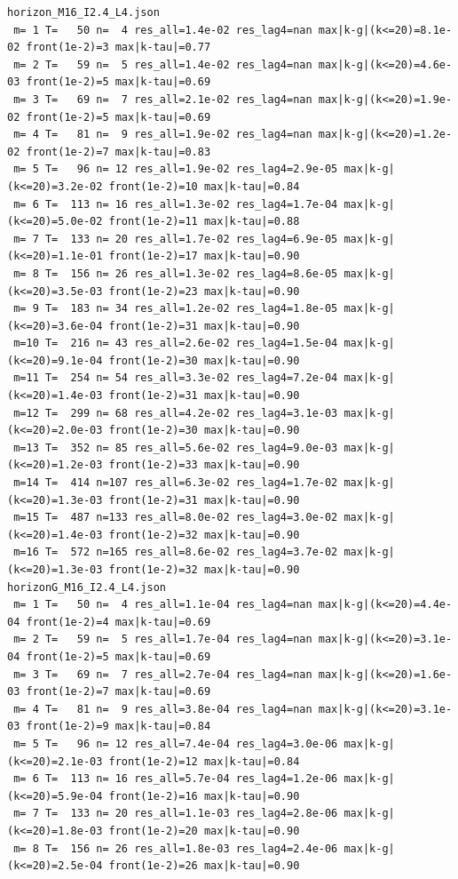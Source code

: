 \documentclass[11pt,reqno]{amsart}
\numberwithin{equation}{section}
\theoremstyle{plain}
\theoremstyle{definition}
\theoremstyle{remark}
\begin{document}
\begin{lstlisting}[style=out]
horizon_M16_I2.4_L4.json
 m= 1 T=   50 n=  4 res_all=1.4e-02 res_lag4=nan max|k-g|(k<=20)=8.1e-02 front(1e-2)=3 max|k-tau|=0.77
 m= 2 T=   59 n=  5 res_all=1.4e-02 res_lag4=nan max|k-g|(k<=20)=4.6e-03 front(1e-2)=5 max|k-tau|=0.69
 m= 3 T=   69 n=  7 res_all=2.1e-02 res_lag4=nan max|k-g|(k<=20)=1.9e-02 front(1e-2)=5 max|k-tau|=0.69
 m= 4 T=   81 n=  9 res_all=1.9e-02 res_lag4=nan max|k-g|(k<=20)=1.2e-02 front(1e-2)=7 max|k-tau|=0.83
 m= 5 T=   96 n= 12 res_all=1.9e-02 res_lag4=2.9e-05 max|k-g|(k<=20)=3.2e-02 front(1e-2)=10 max|k-tau|=0.84
 m= 6 T=  113 n= 16 res_all=1.3e-02 res_lag4=1.7e-04 max|k-g|(k<=20)=5.0e-02 front(1e-2)=11 max|k-tau|=0.88
 m= 7 T=  133 n= 20 res_all=1.7e-02 res_lag4=6.9e-05 max|k-g|(k<=20)=1.1e-01 front(1e-2)=17 max|k-tau|=0.90
 m= 8 T=  156 n= 26 res_all=1.3e-02 res_lag4=8.6e-05 max|k-g|(k<=20)=3.5e-03 front(1e-2)=23 max|k-tau|=0.90
 m= 9 T=  183 n= 34 res_all=1.2e-02 res_lag4=1.8e-05 max|k-g|(k<=20)=3.6e-04 front(1e-2)=31 max|k-tau|=0.90
 m=10 T=  216 n= 43 res_all=2.6e-02 res_lag4=1.5e-04 max|k-g|(k<=20)=9.1e-04 front(1e-2)=30 max|k-tau|=0.90
 m=11 T=  254 n= 54 res_all=3.3e-02 res_lag4=7.2e-04 max|k-g|(k<=20)=1.4e-03 front(1e-2)=31 max|k-tau|=0.90
 m=12 T=  299 n= 68 res_all=4.2e-02 res_lag4=3.1e-03 max|k-g|(k<=20)=2.0e-03 front(1e-2)=30 max|k-tau|=0.90
 m=13 T=  352 n= 85 res_all=5.6e-02 res_lag4=9.0e-03 max|k-g|(k<=20)=1.2e-03 front(1e-2)=33 max|k-tau|=0.90
 m=14 T=  414 n=107 res_all=6.3e-02 res_lag4=1.7e-02 max|k-g|(k<=20)=1.3e-03 front(1e-2)=31 max|k-tau|=0.90
 m=15 T=  487 n=133 res_all=8.0e-02 res_lag4=3.0e-02 max|k-g|(k<=20)=1.4e-03 front(1e-2)=32 max|k-tau|=0.90
 m=16 T=  572 n=165 res_all=8.6e-02 res_lag4=3.7e-02 max|k-g|(k<=20)=1.3e-03 front(1e-2)=32 max|k-tau|=0.90
horizonG_M16_I2.4_L4.json
 m= 1 T=   50 n=  4 res_all=1.1e-04 res_lag4=nan max|k-g|(k<=20)=4.4e-04 front(1e-2)=4 max|k-tau|=0.69
 m= 2 T=   59 n=  5 res_all=1.7e-04 res_lag4=nan max|k-g|(k<=20)=3.1e-04 front(1e-2)=5 max|k-tau|=0.69
 m= 3 T=   69 n=  7 res_all=2.7e-04 res_lag4=nan max|k-g|(k<=20)=1.6e-03 front(1e-2)=7 max|k-tau|=0.69
 m= 4 T=   81 n=  9 res_all=3.8e-04 res_lag4=nan max|k-g|(k<=20)=3.1e-03 front(1e-2)=9 max|k-tau|=0.84
 m= 5 T=   96 n= 12 res_all=7.4e-04 res_lag4=3.0e-06 max|k-g|(k<=20)=2.1e-03 front(1e-2)=12 max|k-tau|=0.84
 m= 6 T=  113 n= 16 res_all=5.7e-04 res_lag4=1.2e-06 max|k-g|(k<=20)=5.9e-04 front(1e-2)=16 max|k-tau|=0.90
 m= 7 T=  133 n= 20 res_all=1.1e-03 res_lag4=2.8e-06 max|k-g|(k<=20)=1.8e-03 front(1e-2)=20 max|k-tau|=0.90
 m= 8 T=  156 n= 26 res_all=1.8e-03 res_lag4=2.4e-06 max|k-g|(k<=20)=2.5e-04 front(1e-2)=26 max|k-tau|=0.90

\end{lstlisting}
\end{document}
